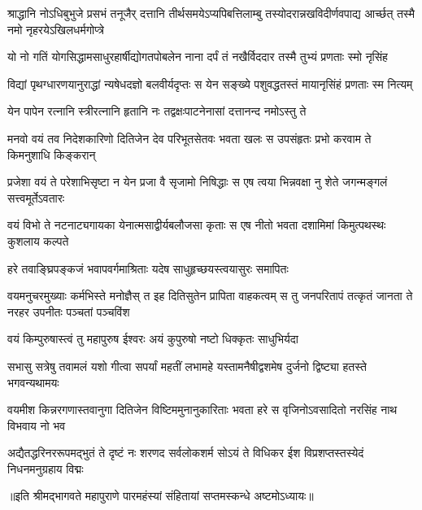 \fourlineindentedshloka
{श्राद्धानि नोऽधिबुभुजे प्रसभं तनूजैर्}
{दत्तानि तीर्थसमयेऽप्यपिबत्तिलाम्बु}
{तस्योदरान्नखविदीर्णवपाद्य आर्च्छत्}
{तस्मै नमो नृहरयेऽखिलधर्मगोप्त्रे} %



\twolineshloka
{यो नो गतिं योगसिद्धामसाधुरहार्षीद्योगतपोबलेन}
{नाना दर्पं तं नखैर्विददार तस्मै तुभ्यं प्रणताः स्मो नृसिंह} %



\twolineshloka
{विद्यां पृथग्धारणयानुराद्धां न्यषेधदज्ञो बलवीर्यदृप्तः}
{स येन सङ्ख्ये पशुवद्धतस्तं मायानृसिंहं प्रणताः स्म नित्यम्} %



\twolineshloka
{येन पापेन रत्नानि स्त्रीरत्नानि हृतानि नः}
{तद्वक्षःपाटनेनासां दत्तानन्द नमोऽस्तु ते} %



\twolineshloka
{मनवो वयं तव निदेशकारिणो दितिजेन देव परिभूतसेतवः}
{भवता खलः स उपसंहृतः प्रभो करवाम ते किमनुशाधि किङ्करान्} %



\twolineshloka
{प्रजेशा वयं ते परेशाभिसृष्टा न येन प्रजा वै सृजामो निषिद्धाः}
{स एष त्वया भिन्नवक्षा नु शेते जगन्मङ्गलं सत्त्वमूर्तेऽवतारः} %



\twolineshloka
{वयं विभो ते नटनाट्यगायका येनात्मसाद्वीर्यबलौजसा कृताः}
{स एष नीतो भवता दशामिमां किमुत्पथस्थः कुशलाय कल्पते} %



\twolineshloka
{हरे तवाङ्घ्रिपङ्कजं भवापवर्गमाश्रिताः}
{यदेष साधुहृच्छयस्त्वयासुरः समापितः} %



\fourlineindentedshloka
{वयमनुचरमुख्याः कर्मभिस्ते मनोज्ञैस्}
{त इह दितिसुतेन प्रापिता वाहकत्वम्}
{स तु जनपरितापं तत्कृतं जानता ते}
{नरहर उपनीतः पञ्चतां पञ्चविंश} %



\twolineshloka
{वयं किम्पुरुषास्त्वं तु महापुरुष ईश्वरः}
{अयं कुपुरुषो नष्टो धिक्कृतः साधुभिर्यदा} %



\twolineshloka
{सभासु सत्रेषु तवामलं यशो गीत्वा सपर्यां महतीं लभामहे}
{यस्तामनैषीद्वशमेष दुर्जनो द्विष्ट्या हतस्ते भगवन्यथामयः} %



\twolineshloka
{वयमीश किन्नरगणास्तवानुगा दितिजेन विष्टिममुनानुकारिताः}
{भवता हरे स वृजिनोऽवसादितो नरसिंह नाथ विभवाय नो भव} %


\twolineshloka
{अद्यैतद्धरिनररूपमद्भुतं ते दृष्टं नः शरणद सर्वलोकशर्म}
{सोऽयं ते विधिकर ईश विप्रशप्तस्तस्येदं निधनमनुग्रहाय विद्मः} %


॥इति श्रीमद्भागवते महापुराणे पारमहंस्यां संहितायां सप्तमस्कन्धे अष्टमोऽध्यायः॥

